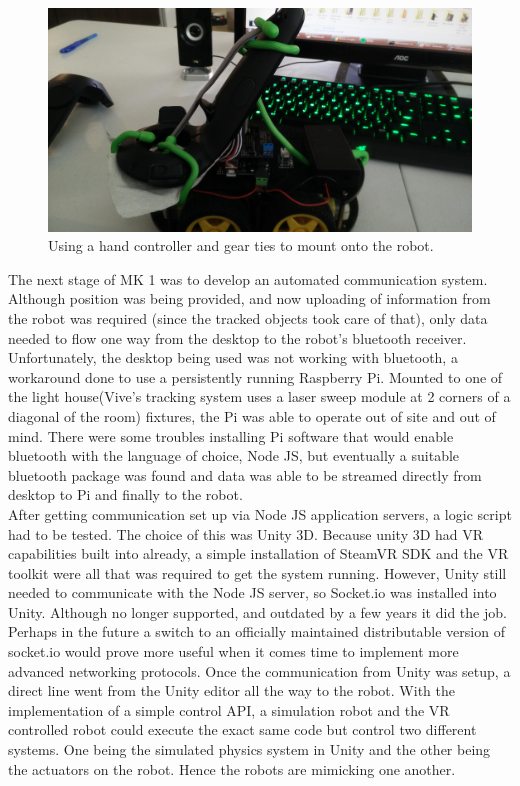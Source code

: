 \documentclass[10pt,a4paper]{article}
\begin{document}
	\begin{figure}
		\centering
		\includegraphics[width=.6\textwidth]{robotv1.jpg}
		\caption{Using a hand controller and gear ties to mount onto the robot.}
		\label{fig:mimic-mk1}
	\end{figure}
	
	The next stage of MK 1 was to develop an automated communication system. Although position was being provided, and now uploading of information from the robot was required (since the tracked objects took care of that), only data needed to flow one way from the desktop to the robot's bluetooth receiver. Unfortunately, the desktop being used was not working with bluetooth, a workaround done to use a persistently running Raspberry Pi. Mounted to one of the light house(Vive's tracking system uses a laser sweep module at 2 corners of a diagonal of the room) fixtures, the Pi was able to operate out of site and out of mind. There were some troubles installing Pi software that would enable bluetooth with the language of choice, Node JS, but eventually a suitable bluetooth package was found and data was able to be streamed directly from desktop to Pi and finally to the robot.
	\\
	After getting communication set up via Node JS application servers, a logic script had to be tested. The choice of this was Unity 3D. Because unity 3D had VR capabilities built into already, a simple installation of SteamVR SDK and the VR toolkit were all that was required to get the system running. However, Unity still needed to communicate with the Node JS server, so Socket.io was installed into Unity. Although no longer supported, and outdated by a few years it did the job. Perhaps in the future a switch to an officially maintained distributable version of socket.io would prove more useful when it comes time to implement more advanced networking protocols. Once the communication from Unity was setup, a direct line went from the Unity editor all the way to the robot. With the implementation of a simple control API, a simulation robot and the VR controlled robot could execute the exact same code but control two different systems. One being the simulated physics system in Unity and the other being the actuators on the robot. Hence the robots are mimicking one another.
\end{document}
